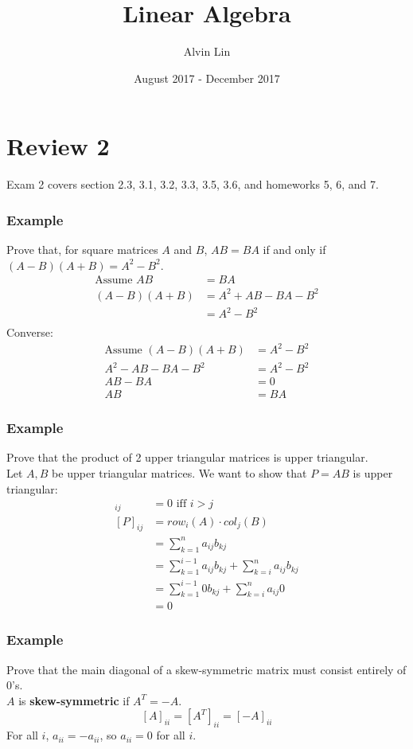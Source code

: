 \documentclass{math}
\title{Linear Algebra}
\author{Alvin Lin}
\date{August 2017 - December 2017}
\begin{document}
\maketitle

\section*{Review 2}
Exam 2 covers section 2.3, 3.1, 3.2, 3.3, 3.5, 3.6, and homeworks 5, 6, and 7.

\subsubsection*{Example}
Prove that, for square matrices \( A \) and \( B \), \( AB = BA \) if and only
if \( (A-B)(A+B) = A^2-B^2 \).
\begin{align*}
  \text{Assume } AB &= BA \\
  (A-B)(A+B) &= A^2+AB-BA-B^2 \\
  &= A^2-B^2 \\
\end{align*}
Converse:
\begin{align*}
  \text{Assume } (A-B)(A+B) &= A^2-B^2 \\
  A^2-AB-BA-B^2 &= A^2-B^2 \\
  AB-BA &= 0 \\
  AB &= BA
\end{align*}

\subsubsection*{Example}
Prove that the product of 2 upper triangular matrices is upper triangular. \\
Let \( A,B \) be upper triangular matrices. We want to show that \( P = AB \)
is upper triangular:
\begin{align*}
  [P]_{ij} &= 0 \text{ iff } i > j \\
  [P]_{ij} &= row_i(A)\cdot col_j(B) \\
  &= \sum_{k=1}^{n}a_{ij}b_{kj} \\
  &= \sum_{k=1}^{i-1}a_{ij}b_{kj}+\sum_{k=i}^{n}a_{ij}b_{kj} \\
  &= \sum_{k=1}^{i-1}0b_{kj}+\sum_{k=i}^{n}a_{ij}0 \\
  &= 0
\end{align*}

\subsubsection*{Example}
Prove that the main diagonal of a skew-symmetric matrix must consist entirely
of 0's. \\
\( A \) is \textbf{skew-symmetric} if \( A^T = -A \).
\[ [A]_{ii} = [A^T]_{ii} = [-A]_{ii} \]
For all \( i \), \( a_{ii} = -a_{ii} \), so \( a_{ii} = 0 \) for all \( i \).
\end{document}
